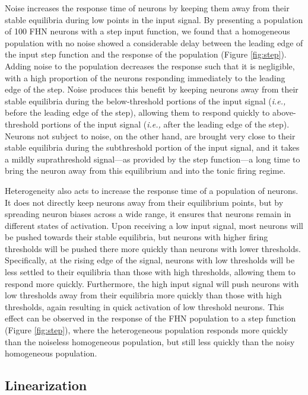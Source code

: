 \documentclass[12pt]{article}
\newcommand{\ie}{\emph{i.e., }}
\newcommand{\fig}[1]{Figure \ref{fig:#1}}
\begin{document}
Noise increases the response time of neurons by keeping them away from their stable equilibria during low points in the input signal. By presenting a population of 100 FHN neurons with a step input function, we found that a homogeneous population with no noise showed a considerable delay between the leading edge of the input step function and the response of the population (\fig{step}). Adding noise to the population decreases the response such that it is negligible, with a high proportion of the neurons responding immediately to the leading edge of the step. Noise produces this benefit by keeping neurons away from their stable equilibria during the below-threshold portions of the input signal (\ie before the leading edge of the step), allowing them to respond quickly to above-threshold portions of the input signal (\ie after the leading edge of the step). Neurons not subject to noise, on the other hand, are brought very close to their stable equilibria during the subthreshold portion of the input signal, and it takes a mildly suprathreshold signal---as provided by the step function---a long time to bring the neuron away from this equilibrium and into the tonic firing regime.

Heterogeneity also acts to increase the response time of a population of neurons. It does not directly keep neurons away from their equilibrium points, but by spreading neuron biases across a wide range, it ensures that neurons remain in different states of activation. Upon receiving a low input signal, most neurons will be pushed towards their stable equilibria, but neurons with higher firing thresholds will be pushed there more quickly than neurons with lower thresholds. Specifically, at the rising edge of the signal, neurons with low thresholds will be less settled to their equilibria than those with high thresholds, allowing them to respond more quickly. Furthermore, the high input signal will push neurons with low thresholds away from their equilibria more quickly than those with high thresholds, again resulting in quick activation of low threshold neurons. This effect can be observed in the response of the FHN population to a step function (\fig{step}), where the heterogeneous population responds more quickly than the noiseless homogeneous population, but still less quickly than the noisy homogeneous population.

\subsection{Linearization}
\end{document}
